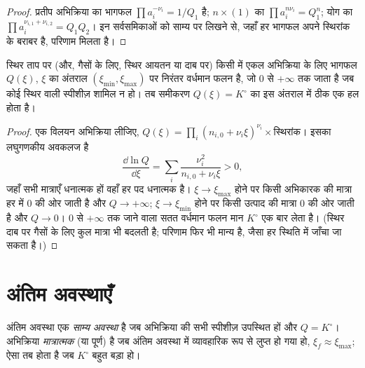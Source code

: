 \begin{proof}
प्रतीप अभिक्रिया का भागफल $\prod a_i^{-\nu_i} = 1/Q_1$ है;
$n \times (1)$ का $\prod a_i^{n\nu_i} = Q_1^n$; योग का
$\prod a_i^{\nu_{i,1} + \nu_{i,2}} = Q_1 Q_2$। इन सर्वसमिकाओं को
साम्य पर लिखने से, जहाँ हर भागफल अपने स्थिरांक के बराबर है, परिणाम मिलता है।
\end{proof}

\begin{proposition}[एक ही साम्य अवस्था]\label{prop:b1:extent-q-and-k:q-monotone}
स्थिर ताप पर (और, गैसों के लिए, स्थिर आयतन या दाब पर) किसी  में एकल अभिक्रिया के लिए भागफल $Q(\xi)$, $\xi$ का अंतराल
$(\xi_{\min}, \xi_{\max})$ पर निरंतर वर्धमान फलन है, जो 0 से
$+\infty$ तक जाता है जब कोई स्थिर  वाली स्पीशीज़ शामिल न हो। तब
समीकरण $Q(\xi) = K^\circ$ का इस अंतराल में ठीक एक हल
होता है।
\end{proposition}

\begin{proof}
एक विलयन अभिक्रिया लीजिए, $Q(\xi) = \prod_i (n_{i,0} + \nu_i\xi)^{\nu_i}
\times \text{स्थिरांक}$। इसका लघुगणकीय अवकलज है
\[
  \frac{\dd \ln Q}{\dd \xi} = \sum_i \frac{\nu_i^2}{n_{i,0} + \nu_i \xi}
  > 0 ,
\]
जहाँ सभी मात्राएँ धनात्मक हों वहाँ हर पद धनात्मक है। $\xi \to \xi_{\max}$ होने पर
किसी अभिकारक की मात्रा हर में 0 की ओर जाती है और $Q \to +\infty$; $\xi
\to \xi_{\min}$ होने पर किसी उत्पाद की मात्रा 0 की ओर जाती है और $Q \to 0$। 0 से
$+\infty$ तक जाने वाला सतत वर्धमान फलन मान $K^\circ$ एक बार लेता है।
(स्थिर दाब पर गैसों के लिए कुल मात्रा भी बदलती है; परिणाम
फिर भी मान्य है, जैसा हर स्थिति में जाँचा जा सकता है।)
\end{proof}

\section{अंतिम अवस्थाएँ}

\begin{definition}[साम्य अवस्था, मात्रात्मक अभिक्रिया]\label{def:b1:extent-q-and-k:quantitative}
अंतिम अवस्था एक \emph{साम्य अवस्था} है
जब अभिक्रिया की सभी स्पीशीज़ उपस्थित हों और $Q = K^\circ$। अभिक्रिया
\emph{मात्रात्मक} (या पूर्ण) है
जब अंतिम अवस्था में  व्यावहारिक रूप से
लुप्त हो गया हो, $\xi_f \approx \xi_{\max}$; ऐसा तब होता है जब $K^\circ$
बहुत बड़ा हो।
\end{definition}

